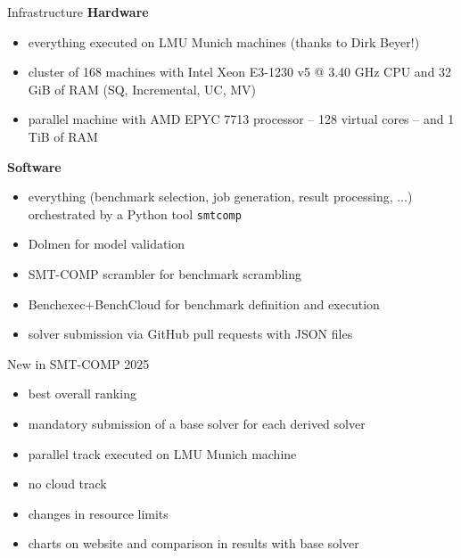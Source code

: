 \documentclass[table]{beamer}
\def\emph#1{\textcolor{MYblue}{#1}}
\begin{document}
\begin{frame}{Infrastructure}
  \textbf{Hardware}
  \begin{itemize}
  \item everything executed on LMU Munich machines (thanks to Dirk Beyer!)
  \item cluster of 168 machines with Intel Xeon E3-1230 v5 @ 3.40 GHz CPU and 32 GiB of RAM (SQ, Incremental, UC, MV)
  \item parallel machine with AMD EPYC 7713 processor -- \emph{128 virtual cores} -- and 1 TiB of RAM
  \end{itemize}

  \bigskip

  \textbf{Software}
  \begin{itemize}
  \item everything (benchmark selection, job generation, result processing, $\ldots$) orchestrated by a Python tool \texttt{smtcomp}
  \item Dolmen for model validation
  \item SMT-COMP scrambler for benchmark scrambling
  \item Benchexec+BenchCloud for benchmark definition and execution
  \item solver submission via GitHub pull requests with JSON files
  \end{itemize}
\end{frame}

\begin{frame}{New in SMT-COMP 2025}
  \begin{itemize}
  \item best overall ranking
  \item mandatory submission of a base solver for each derived solver
  \item parallel track executed on LMU Munich machine
  \item no cloud track
  \item changes in resource limits
  \item charts on website and comparison in results with base solver
  \end{itemize}
\end{frame}
\end{document}

